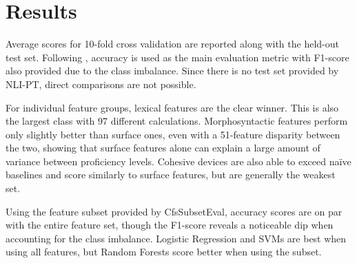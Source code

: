 
\section{Results}

Average scores for 10-fold cross validation are reported along with the held-out test set. Following \cite{delrio2019a}, accuracy is used as the main evaluation metric with F1-score also provided due to the class imbalance. Since there is no test set provided by NLI-PT, direct comparisons are not possible.

For individual feature groups, lexical features are the clear winner. This is also the largest class with 97 different calculations. Morphosyntactic features perform only slightly better than surface ones, even with a 51-feature disparity between the two, showing that surface features alone can explain a large amount of variance between proficiency levels. Cohesive devices are also able to exceed naïve baselines and score similarly to surface features, but are generally the weakest set.

Using the feature subset provided by CfsSubsetEval, accuracy scores are on par with the entire feature set, though the F1-score reveals a noticeable dip when accounting for the class imbalance. Logistic Regression and SVMs are best when using all features, but Random Forests score better when using the subset.

\pagebreak

\vspace{\fill}

